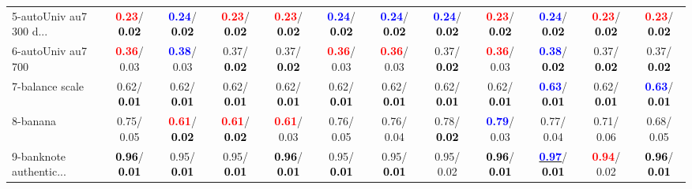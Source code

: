 \begin{table}[h]
\begin{center}
{\begin{tabular}{lc|c|c|c|c|c|c|c|c|c|c}
5-autoUniv au7 300 d... & \textcolor{red}{\textbf{  0.23}}/\textcolor{black}{\textbf{  0.02}} & \textcolor{blue}{\textbf{  0.24}}/\textcolor{black}{\textbf{  0.02}} & \textcolor{red}{\textbf{  0.23}}/\textcolor{black}{\textbf{  0.02}} & \textcolor{red}{\textbf{  0.23}}/\textcolor{black}{\textbf{  0.02}} & \textcolor{blue}{\textbf{  0.24}}/\textcolor{black}{\textbf{  0.02}} & \textcolor{blue}{\textbf{  0.24}}/\textcolor{black}{\textbf{  0.02}} & \textcolor{blue}{\textbf{  0.24}}/\textcolor{black}{\textbf{  0.02}} & \textcolor{red}{\textbf{  0.23}}/\textcolor{black}{\textbf{  0.02}} & \textcolor{blue}{\textbf{  0.24}}/\textcolor{black}{\textbf{  0.02}} & \textcolor{red}{\textbf{  0.23}}/\textcolor{black}{\textbf{  0.02}} & \textcolor{red}{\textbf{  0.23}}/\textcolor{black}{\textbf{  0.02}} \\
6-autoUniv au7 700 & \textcolor{red}{\textbf{  0.36}}/  0.03 & \textcolor{blue}{\textbf{  0.38}}/  0.03 &   0.37/\textcolor{black}{\textbf{  0.02}} &   0.37/\textcolor{black}{\textbf{  0.02}} & \textcolor{red}{\textbf{  0.36}}/  0.03 & \textcolor{red}{\textbf{  0.36}}/  0.03 &   0.37/\textcolor{black}{\textbf{  0.02}} & \textcolor{red}{\textbf{  0.36}}/  0.03 & \textcolor{blue}{\textbf{  0.38}}/\textcolor{black}{\textbf{  0.02}} &   0.37/\textcolor{black}{\textbf{  0.02}} &   0.37/\textcolor{black}{\textbf{  0.02}} \\
7-balance scale &   0.62/\textcolor{black}{\textbf{  0.01}} &   0.62/\textcolor{black}{\textbf{  0.01}} &   0.62/\textcolor{black}{\textbf{  0.01}} &   0.62/\textcolor{black}{\textbf{  0.01}} &   0.62/\textcolor{black}{\textbf{  0.01}} &   0.62/\textcolor{black}{\textbf{  0.01}} &   0.62/\textcolor{black}{\textbf{  0.01}} &   0.62/\textcolor{black}{\textbf{  0.01}} & \textcolor{blue}{\textbf{  0.63}}/\textcolor{black}{\textbf{  0.01}} &   0.62/\textcolor{black}{\textbf{  0.01}} & \textcolor{blue}{\textbf{  0.63}}/\textcolor{black}{\textbf{  0.01}} \\ \hline
8-banana &   0.75/  0.05 & \textcolor{red}{\textbf{  0.61}}/\textcolor{black}{\textbf{  0.02}} & \textcolor{red}{\textbf{  0.61}}/\textcolor{black}{\textbf{  0.02}} & \textcolor{red}{\textbf{  0.61}}/  0.03 &   0.76/  0.05 &   0.76/  0.04 &   0.78/\textcolor{black}{\textbf{  0.02}} & \textcolor{blue}{\textbf{  0.79}}/  0.03 &   0.77/  0.04 &   0.71/  0.06 &   0.68/  0.05 \\
9-banknote authentic... & \textcolor{black}{\textbf{  0.96}}/\textcolor{black}{\textbf{  0.01}} &   0.95/\textcolor{black}{\textbf{  0.01}} &   0.95/\textcolor{black}{\textbf{  0.01}} & \textcolor{black}{\textbf{  0.96}}/\textcolor{black}{\textbf{  0.01}} &   0.95/\textcolor{black}{\textbf{  0.01}} &   0.95/\textcolor{black}{\textbf{  0.01}} &   0.95/  0.02 & \textcolor{black}{\textbf{  0.96}}/\textcolor{black}{\textbf{  0.01}} & \underline{\textcolor{blue}{\textbf{  0.97}}}/\textcolor{black}{\textbf{  0.01}} & \textcolor{red}{\textbf{  0.94}}/  0.02 & \textcolor{black}{\textbf{  0.96}}/\textcolor{black}{\textbf{  0.01}} \\

\end{tabular}}
\end{center}
\end{table}
